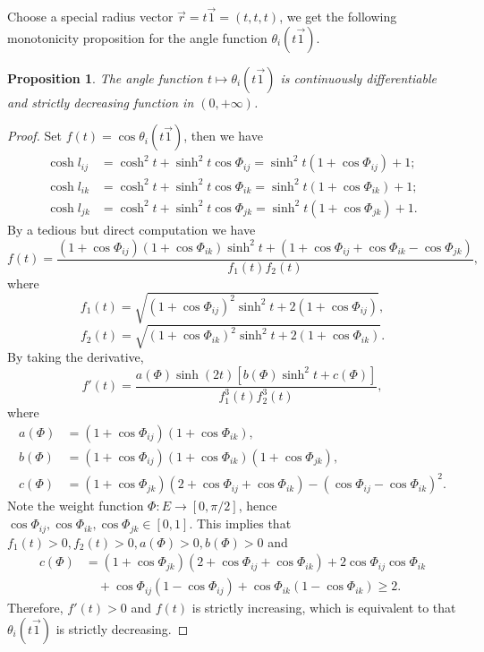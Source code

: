\documentclass[12pt]{amsart}
\numberwithin{equation}{section}
\newtheorem{prop}{Proposition}[section]
\begin{document}
Choose a special radius vector $\vec{r} = t\vec{1} = (t, t, t)$, we get the following monotonicity proposition for the
angle function $\theta_i(t\vec{1})$.

\begin{prop}\label{prop:5.2}
The angle function $t \mapsto \theta_i(t\vec{1})$ is continuously differentiable and strictly decreasing
function in $(0, +\infty)$.
\end{prop}

\begin{proof}
Set $f(t) = \cos\theta_i(t\vec{1})$, then we have
\begin{align*}
\cosh l_{ij} &= \cosh^2 t + \sinh^2 t \cos\Phi_{ij} = \sinh^2 t(1 + \cos\Phi_{ij}) + 1; \\
\cosh l_{ik} &= \cosh^2 t + \sinh^2 t \cos\Phi_{ik} = \sinh^2 t(1 + \cos\Phi_{ik}) + 1; \\
\cosh l_{jk} &= \cosh^2 t + \sinh^2 t \cos\Phi_{jk} = \sinh^2 t(1 + \cos\Phi_{jk}) + 1.
\end{align*}
By a tedious but direct computation we have
\begin{equation}\label{eq:5.1}
f(t) = \frac{(1 + \cos\Phi_{ij})(1 + \cos\Phi_{ik})\sinh^2 t + (1 + \cos\Phi_{ij} + \cos\Phi_{ik} - \cos\Phi_{jk})}{f_1(t)f_2(t)},
\end{equation}
where
\[
f_1(t) = \sqrt{(1 + \cos\Phi_{ij})^2\sinh^2 t + 2(1 + \cos\Phi_{ij})},
\]
\[
f_2(t) = \sqrt{(1 + \cos\Phi_{ik})^2\sinh^2 t + 2(1 + \cos\Phi_{ik})}.
\]
By taking the derivative,
\begin{equation}\label{eq:5.2}
f'(t) = \frac{a(\Phi)\sinh(2t)[b(\Phi)\sinh^2 t + c(\Phi)]}{f_1^3(t)f_2^3(t)},
\end{equation}
where
\begin{align*}
a(\Phi) &= (1 + \cos\Phi_{ij})(1 + \cos\Phi_{ik}), \\
b(\Phi) &= (1 + \cos\Phi_{ij})(1 + \cos\Phi_{ik})(1 + \cos\Phi_{jk}), \\
c(\Phi) &= (1 + \cos\Phi_{jk})(2 + \cos\Phi_{ij} + \cos\Phi_{ik}) - (\cos\Phi_{ij} - \cos\Phi_{ik})^2.
\end{align*}
Note the weight function $\Phi : E \to [0,\pi/2]$, hence $\cos\Phi_{ij}, \cos\Phi_{ik}, \cos\Phi_{jk} \in [0,1]$. This implies that
$f_1(t) > 0, f_2(t) > 0, a(\Phi) > 0, b(\Phi) > 0$ and
\begin{align*}
c(\Phi) &= (1 + \cos\Phi_{jk})(2 + \cos\Phi_{ij} + \cos\Phi_{ik}) + 2\cos\Phi_{ij}\cos\Phi_{ik} \\
&\quad + \cos\Phi_{ij}(1 - \cos\Phi_{ij}) + \cos\Phi_{ik}(1 - \cos\Phi_{ik}) \geq 2.
\end{align*}
Therefore, $f'(t) > 0$ and $f(t)$ is strictly increasing, which is equivalent to that $\theta_i(t\vec{1})$ is strictly decreasing.
\end{proof}
\end{document}
